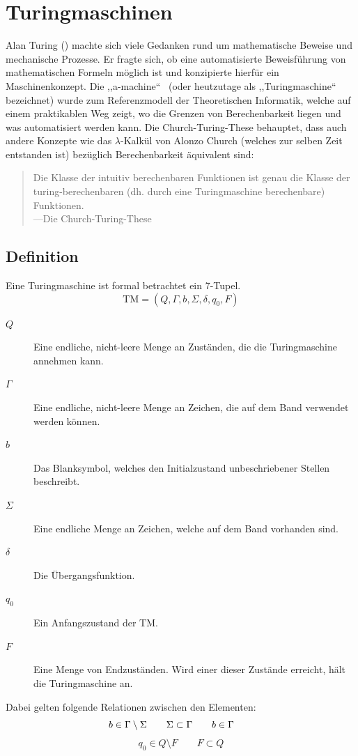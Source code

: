 \chapter{Turingmaschinen}
\label{sec:turingmachine}
\newcommand{\blank}{b}
%
Alan Turing () machte sich viele Gedanken rund um mathematische Beweise und mechanische Prozesse. Er fragte sich, ob eine automatisierte Beweisführung von mathematischen Formeln möglich ist und konzipierte hierfür ein Maschinenkonzept. Die ,,a-machine``~\cite{Turing01011937} (oder heutzutage als ,,Turingmaschine`` bezeichnet) wurde zum Referenzmodell der Theoretischen Informatik, welche auf einem praktikablen Weg zeigt, wo die Grenzen von Berechenbarkeit liegen und was automatisiert werden kann. Die Church-Turing-These behauptet, dass auch andere Konzepte wie das $\lambda$-Kalkül von Alonzo Church (welches zur selben Zeit entstanden ist) bezüglich Berechenbarkeit äquivalent sind:
%
\begin{quotation}
 Die Klasse der intuitiv berechenbaren Funktionen ist genau die Klasse der turing-berechenbaren (dh. durch eine Turingmaschine berechenbare) Funktionen. \\
 ---Die Church-Turing-These
\end{quotation}
%
\section{Definition}
%
Eine Turingmaschine ist formal betrachtet ein 7-Tupel.
\begin{equation}
  \text{TM} = (Q, \Gamma, \blank, \Sigma, \delta, q_0, F)
\end{equation}
%
\begin{description}
 \item[$Q$] Eine endliche, nicht-leere Menge an Zuständen, die die Turingmaschine annehmen kann.
 \item[$\Gamma$] Eine endliche, nicht-leere Menge an Zeichen, die auf dem Band verwendet werden können.
 \item[$\blank$] Das Blanksymbol, welches den Initialzustand unbeschriebener Stellen beschreibt.
 \item[$\Sigma$] Eine endliche Menge an Zeichen, welche auf dem Band vorhanden sind.
 \item[$\delta$] Die Übergangsfunktion.
 \item[$q_0$] Ein Anfangszustand der TM.
 \item[$F$] Eine Menge von Endzuständen. Wird einer dieser Zustände erreicht, hält die Turingmaschine an.
\end{description}
%
Dabei gelten folgende Relationen zwischen den Elementen:
\begin{displaymath}
  \blank \in \Gamma \setminus \Sigma  \qquad
  \Sigma \subset \Gamma  \mathspace  \blank \in \Gamma  \qquad
\end{displaymath}
\begin{displaymath}
  q_0 \in Q \setminus F \qquad
  F \subset Q
\end{displaymath}

